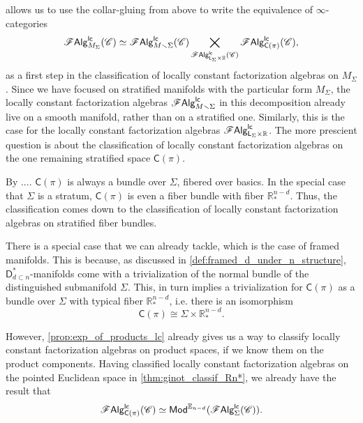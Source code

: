 \documentclass[../text]{subfiles}
\begin{document}
 allows us to use the collar-gluing from above to write the equivalence of $\infty$-categories
%
\begin{equation}
    \mathscr{F} \mathsf{Alg}^{\mathsf{lc}}_{M_\Sigma} (\mathscr{C}) \simeq \mathscr{F} \mathsf{Alg}^{\mathsf{lc}}_{M \smallsetminus \Sigma} (\mathscr{C}) \bigtimes_{\mathscr{F} \mathsf{Alg}^{\mathsf{lc}}_{\mathsf{L}_\Sigma \times \mathbb{R}} (\mathscr{C})} \mathscr{F} \mathsf{Alg}^{\mathsf{lc}}_{\mathsf{C}(\pi)} (\mathscr{C}),
\end{equation}
%
as a first step in the classification of locally constant factorization algebras on $M_{\Sigma}$. Since we have focused on stratified manifolds with the particular form $M_{\Sigma}$, the locally constant factorization algebras $\mathscr{F} \mathsf{Alg}^{\mathsf{lc}}_{M \smallsetminus \Sigma}$ in this decomposition already live on a smooth manifold, rather than on a stratified one. Similarly, this is the case for the locally constant factorization algebras $\mathscr{F} \mathsf{Alg}^{\mathsf{lc}}_{\mathsf{L}_\Sigma \times \mathbb{R}}$. The more prescient question is about the classification of locally constant factorization algebras on the one remaining stratified space $\mathsf{C}(\pi)$. 

By .... $\mathsf{C}(\pi)$ is always a bundle over $\Sigma$, fibered over basics. In the special case that $\Sigma$ is a stratum, $\mathsf{C}(\pi)$ is even a fiber bundle with fiber $\mathbb{R}^{n-d}_*$. Thus, the classification comes down to the classification of locally constant factorization algebras on stratified fiber bundles.

There is a special case that we can already tackle, which is the case of framed manifolds. This is because, as discussed in \cref{def:framed_d_under_n_structure}, $\mathsf{D}_{d \subset n}^*$-manifolds come with a trivialization of the normal bundle of the distinguished submanifold $\Sigma$. This, in turn implies a trivialization for $\mathsf{C}(\pi)$ as a bundle over $\Sigma$ with typical fiber $\mathbb{R}^{n-d}_*$, i.e. there is an isomorphism
%
\begin{equation}
    \mathsf{C}(\pi) \cong \Sigma \times \mathbb{R}^{n-d}_*.
\end{equation}

However, \cref{prop:exp_of_products_lc} already gives us a way to classify locally constant factorization algebras on product spaces, if we know them on the product components. Having classified locally constant factorization algebras on the pointed Euclidean space in \cref{thm:ginot_classif_Rn*}, we already have the result that
%
\begin{equation}
    \mathscr{F} \mathsf{Alg}^{\mathsf{lc}}_{\mathsf{C}(\pi)} (\mathscr{C}) \simeq \mathsf{Mod}^{\mathbb{E}_{n-d}} (\mathscr{F} \mathsf{Alg}^{\mathsf{lc}}_{\Sigma} (\mathscr{C})).
\end{equation}
\end{document}
